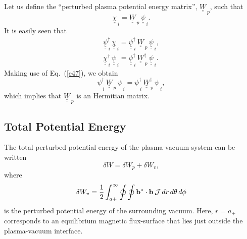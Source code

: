 \documentclass[12pt,prb,aps]{revtex4-1}
\begin{document}
Let us define the ``perturbed plasma potential energy matrix'', $\underline{\underline{W}}_{\,p}$, such that 
\begin{equation}\label{e48}
\underline{\underline{\chi}}_{\,i} = \underline{\underline{W}}_{\,p}\,\underline{\underline{\psi}}_{\,i}.
\end{equation}
 It is easily seen that
 \begin{align}
 \underline{\underline{\psi}}^{\dag}_{\,i}\,\underline{\underline{\chi}}_{\,i}= \underline{\underline{\psi}}^{\dag}_{\,i}\,\underline{\underline{W}}_{\,p}\,
 \underline{\underline{\psi}}_{\,i},\\[0.5ex]
 \underline{\underline{\chi}}^{\dag}_{\,i}\,\underline{\underline{\psi}}_{\,i}= \underline{\underline{\psi}}^{\dag}_{\,i}\,\underline{\underline{W}}_{\,p}^{\dag}\,
 \underline{\underline{\psi}}_{\,i}.
 \end{align}
 Making use of Eq.~(\ref{e47}), we obtain
 \begin{equation}
 \underline{\underline{\psi}}^{\dag}_{\,i}\,\underline{\underline{W}}_{\,p}\,
 \underline{\underline{\psi}}_{\,i}=
 \underline{\underline{\psi}}^{\dag}_{\,i}\,\underline{\underline{W}}_{\,p}^{\dag}\,
 \underline{\underline{\psi}}_{\,i},
 \end{equation}
 which implies that $\underline{\underline{W}}_{\,p}$ is an Hermitian matrix. 
  
\subsection{Total Potential Energy}
The total perturbed potential energy of the plasma-vacuum system can be written\,\cite{freidberg,ideal}
\begin{equation}\label{e79}
\delta W= \delta W_p + \delta W_v,
\end{equation}
where
\begin{equation}
\delta W_v = \frac{1}{2}\int_{a+}^\infty\oint\oint {\bf b}^\ast\cdot{\bf b} \,{\cal J}\,dr\,d\theta\,d\phi
\end{equation}
is the perturbed potential energy of the surrounding vacuum.\cite{freidberg,ideal} Here, $r=a_+$ corresponds to an equilibrium magnetic flux-surface that lies just outside the plasma-vacuum interface. 
\end{document}
